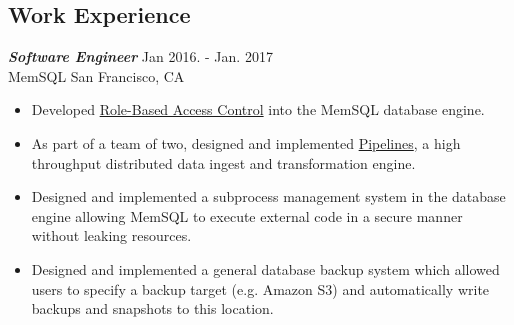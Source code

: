 \documentclass[line,10pt]{res}
\newcommand{\resumetitlemar}{0.5em}
\begin{document}
\begin{resume}





\vspace{0.2em}
\section{\Large \sc \textbf Work Experience}
\vspace{0.5em}

{\sl \textbf{Software Engineer}} \hfill Jan 2016. - Jan. 2017 \\
MemSQL \hfill San Francisco, CA\null
\vspace{\resumetitlemar}
\begin{itemize} \itemsep -2pt
\item Developed \href{https://docs.memsql.com/operational-manual/v5.7/role-based-access-control-rbac-deployment-guide/}{Role-Based Access Control} into the MemSQL database engine.
\item As part of a team of two, designed and implemented \href{https://docs.memsql.com/memsql-pipelines/v6.0/pipelines-overview/}{Pipelines}, a high throughput distributed data ingest and transformation engine. 
\item Designed and implemented a subprocess management system in the database engine allowing MemSQL to execute external code in a secure manner without leaking resources.
\item Designed and implemented a general database backup system which allowed users to specify a backup target (e.g. Amazon S3) and automatically write backups and snapshots to this location. 
\end{itemize}


\end{resume}
\end{document}
